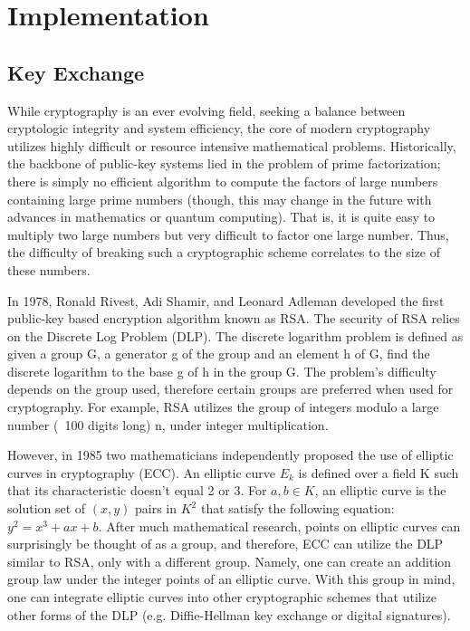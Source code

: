 \section{Implementation}

\subsection{Key Exchange}
While cryptography is an ever evolving field, seeking a balance between cryptologic integrity and system efficiency, the core of modern cryptography utilizes highly difficult or resource intensive mathematical problems. Historically, the backbone of public-key systems lied in the problem of prime factorization; there is simply no efficient algorithm to compute the factors of large numbers containing large prime numbers (though, this may change in the future with advances in mathematics or quantum computing). That is, it is quite easy to multiply two large numbers but very difficult to factor one large number. Thus, the difficulty of breaking such a cryptographic scheme correlates to the size of these numbers.

In 1978, Ronald Rivest, Adi Shamir, and Leonard Adleman developed the first public-key based encryption algorithm known as RSA. The security of RSA relies on the Discrete Log Problem (DLP). The discrete logarithm problem is defined as given a group G, a generator g of the group and an element h of G, find the discrete logarithm to the base g of h in the group G. The problem's difficulty depends on the group used, therefore certain groups are preferred when used for cryptography. For example, RSA utilizes the group of integers modulo a large number (~100 digits long) n, under integer multiplication. 

However, in 1985 two mathematicians independently proposed the use of elliptic curves in cryptography (ECC). An elliptic curve $E_k$ is defined over a field K such that its characteristic doesn't equal 2 or 3. For $a,b \in K$, an elliptic curve is the solution set of $(x,y)$ pairs in $K^2$ that satisfy the following equation: $y^2 = x^3 + ax + b$. After much mathematical research, points on elliptic curves can surprisingly be thought of as a group, and therefore, ECC can utilize the DLP similar to RSA, only with a different group. Namely, one can create an addition group law under the integer points of an elliptic curve. With this group in mind, one can integrate elliptic curves into other cryptographic schemes that utilize other forms of the DLP (e.g. Diffie-Hellman key exchange or digital signatures).

